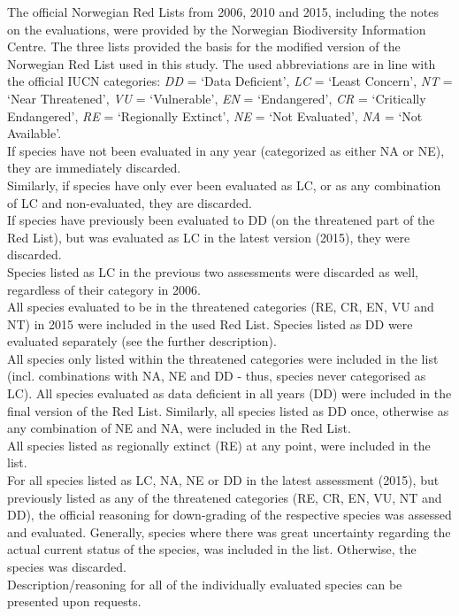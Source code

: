 \documentclass{article}
\begin{document}
The official Norwegian Red Lists from 2006, 2010 and 2015, including the notes on the evaluations, were provided by the Norwegian Biodiversity Information Centre. The three lists provided the basis for the modified version of the Norwegian Red List used in this study. The used abbreviations are in line with the official IUCN categories:  \textit{DD} = `Data Deficient', \textit{LC} = `Least Concern', \textit{NT} = `Near Threatened', \textit{VU} = `Vulnerable', \textit{EN} = `Endangered', \textit{CR} = `Critically Endangered', \textit{RE} = `Regionally Extinct', \textit{NE} = `Not Evaluated', \textit{NA} = `Not Available'.\\
If species have not been evaluated in any year (categorized as either NA or NE), they are immediately discarded.\\
Similarly, if species have only ever been evaluated as LC, or as any combination of LC and non-evaluated, they are discarded.\\
If species have previously been evaluated to DD (on the threatened part of the Red List), but was evaluated as LC in the latest version (2015), they were discarded.\\
Species listed as LC in the previous two assessments were discarded as well, regardless of their category in 2006.\\

All species evaluated to be in the threatened categories (RE, CR, EN, VU and NT) in 2015 were included in the used Red List. Species listed as DD were evaluated separately (see the further description).\\
All species only listed within the threatened categories were included in the list (incl. combinations with NA, NE and DD - thus, species never categorised as LC).
All species evaluated as data deficient in all years (DD) were included in the final version of the Red List. Similarly, all species listed as DD once, otherwise as any combination of NE and NA, were included in the Red List.\\
All species listed as regionally extinct (RE) at any point, were included in the list.\\

For all species listed as LC, NA, NE or DD in the latest assessment (2015), but previously listed as any of the threatened categories (RE, CR, EN, VU, NT and DD), the official reasoning for down-grading of the respective species was assessed and evaluated. Generally, species where there was great uncertainty regarding the actual current status of the species, was included in the list. Otherwise, the species was discarded.\\
Description/reasoning for all of the individually evaluated species can be presented upon requests.
\end{document}
